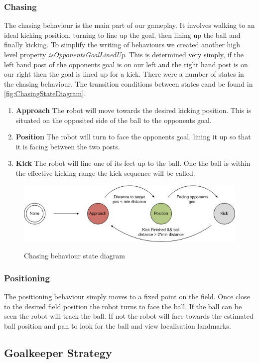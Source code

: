 \subsubsection{Chasing}
The chasing behaviour is the main part of our gameplay. It involves walking to an ideal kicking position. turning to line up the goal, then lining up the ball and finally kicking. To simplify the writing of behaviours we created another high level property \emph{isOpponentsGoalLinedUp}. This is determined very simply, if the left hand post of the opponents goal is on our left and the right hand post is on our right then the goal is lined up for a kick. There were a number of states in the chasing behaviour. The transition conditions between states cand be found in \autoref{fig:ChasingStateDiagram}.
\begin{enumerate}
\item \textbf{Approach} The robot will move towards the desired kicking position. This is situated on the opposited side of the ball to the opponents goal.
\item \textbf{Position} The robot will turn to face the opponents goal, lining it up so that it is facing between the two posts.
\item \textbf{Kick} The robot will line one of its feet up to the ball. One the ball is within the effective kicking range the kick sequence will be called.
\end{enumerate}

\begin{figure}[!h]
\begin{center}
   \leavevmode
    \scalebox{0.8} {\includegraphics{figs/FieldPlayerChasingStates.jpg} }
    \caption{Chasing behaviour state diagram}
    \label{fig:ChasingStateDiagram}
\end{center}
\end{figure}

\subsubsection{Positioning}
The positioning behaviour simply moves to a fixed point on the field. Once close to the desired field position the robot turns to face the ball. If the ball can be seen the robot will track the ball. If not the robot will face towards the estimated ball position and pan to look for the ball and view localisation landmarks.

\subsection{Goalkeeper Strategy}
